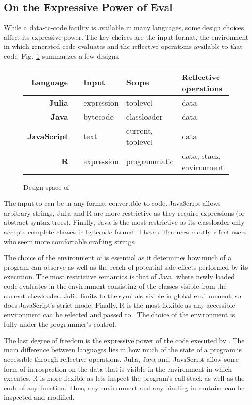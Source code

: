 \documentclass[screen,acmsmall]{acmart}%
\begin{document}
\subsection{On the Expressive Power of Eval}

While a data-to-code facility is available in many languages, some design
choices affect its expressive power. The key choices are the input format, the
environment in which generated code evaluates and the reflective operations
available to that code. Fig.~\ref{comp} summarizes a few designs.

\begin{figure}[!h]\center\small\begin{tabular}{r@{~}l|l|l|l}\hline
\tiny\sc Language&&\sc\tiny Input&\sc\tiny Scope&\tiny\sc Reflective operations\\\hline
\bf Julia&\cite{julia}     & expression& toplevel         & data\\
\bf Java&\cite{cl}  & bytecode  & classloader       & data\\
\bf JavaScript&\cite{ecoop11}& text      & current, toplevel& data\\
\bf R&\cite{R96}  & expression& programmatic      & data, stack, environment\\\hline
\end{tabular}\caption{Design space of \eval}\label{comp}
\end{figure}

The input to \eval can be in any format convertible to code. JavaScript allows
arbitrary strings, Julia and R are more restrictive as they require expressions
(or abstract syntax trees). Finally, Java is the most restrictive as its
classloader only accepts complete classes in bytecode format. These differences
mostly affect users who seem more comfortable crafting strings.

The choice of the environment of \eval is essential as it determines how much of
a program \eval can observe as well as the reach of potential side-effects
performed by its execution. The most restrictive semantics is that of Java,
where newly loaded code evaluates in the environment consisting of the classes
visible from the current classloader. Julia limits \eval to the symbols visible
in global environment, so does JavaScript's strict mode. Finally, R is the most
flexible as any accessible environment can be selected and passed to \eval. The
choice of the environment is fully under the programmer's control.

The last degree of freedom is the expressive power of the code executed by
\eval. The main difference between languages lies in how much of the state of a
program is accessible through reflective operations. Julia, Java and, JavaScript
allow some form of introspection on the data that is visible in the environment
in which \eval executes. R is more flexible as lets \eval inspect the program's
call stack as well as the code of any function. Thus, any environment and any
binding in contains can be inspected and modified.
\end{document}
